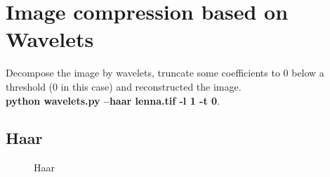 \pagebreak

\section{Image compression based on Wavelets}

Decompose the image by wavelets, truncate some coefficients to 0 below a threshold (0 in this case) and reconstructed the image.\\
\textbf{python wavelets.py --haar lenna.tif -l 1 -t 0}.

\pagebreak
\subsection{Haar}

\begin{figure}[!htb]\centering
    \begin{minipage}{0.8\textwidth}
        \caption{\small{Haar}}
    \end{minipage}
\end{figure}


